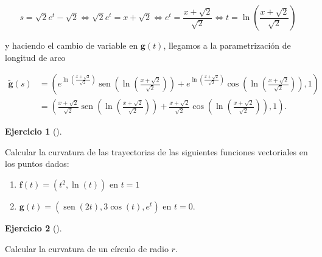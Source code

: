 \documentclass[
  a4paper,
]{scrreport}
\theoremstyle{definition}
\newtheorem{exercise}{Ejercicio}[chapter]
\theoremstyle{remark}
\begin{document}
\begin{tcolorbox}
\begin{enumerate}
  \[
  s = \sqrt{2}e^t-\sqrt{2}
  \Leftrightarrow \sqrt{2}e^t = x+\sqrt{2}
  \Leftrightarrow e^t = \frac{x+\sqrt{2}}{\sqrt{2}}
  \Leftrightarrow t = \ln\left(\frac{x+\sqrt{2}}{\sqrt{2}}\right)
  \]

  y haciendo el cambio de variable en \(\mathbf{g}(t)\), llegamos a la
  parametrización de longitud de arco

  \begin{align*}
  \tilde{\mathbf{g}}(s) 
  &= \left(e^{\ln\left(\frac{x+\sqrt{2}}{\sqrt{2}}\right)}\operatorname{sen}\left(\ln\left(\frac{x+\sqrt{2}}{\sqrt{2}}\right)\right) + e^{\ln\left(\frac{x+\sqrt{2}}{\sqrt{2}}\right)}\cos\left(\ln\left(\frac{x+\sqrt{2}}{\sqrt{2}}\right)\right), 1 \right) \\
  &= \left(\frac{x+\sqrt{2}}{\sqrt{2}}\operatorname{sen}\left(\ln\left(\frac{x+\sqrt{2}}{\sqrt{2}}\right)\right) + \frac{x+\sqrt{2}}{\sqrt{2}}\cos\left(\ln\left(\frac{x+\sqrt{2}}{\sqrt{2}}\right)\right), 1 \right).
  \end{align*}
\end{enumerate}

\end{tcolorbox}

\begin{exercise}[]\protect\hypertarget{exr-curvatura-1}{}\label{exr-curvatura-1}

Calcular la curvatura de las trayectorias de las siguientes funciones
vectoriales en los puntos dados:

\begin{enumerate}
\def\labelenumi{\alph{enumi}.}
\item
  \(\mathbf{f}(t) = (t^2, \ln(t))\) en \(t=1\)
\item
  \(\mathbf{g}(t) = (\operatorname{sen}(2t), 3\cos(t), e^t)\) en
  \(t=0\).
\end{enumerate}

\end{exercise}

\begin{exercise}[]\protect\hypertarget{exr-curvatura-circulo}{}\label{exr-curvatura-circulo}

Calcular la curvatura de un círculo de radio \(r\).

\end{exercise}
\end{document}
